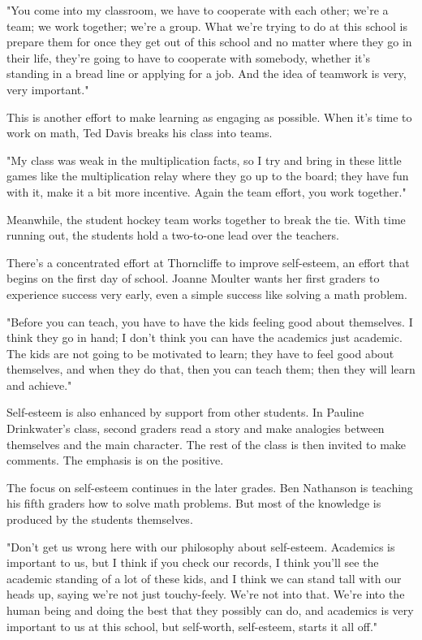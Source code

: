 "You come into my classroom, we have to cooperate with each other; we're a team; we work together; we're a group. What we're trying to do at this school is prepare them for once they get out of this school and no matter where they go in their life, they're going to have to cooperate with somebody, whether it's standing in a bread line or applying for a job. And the idea of teamwork is very, very important."

This is another effort to make learning as engaging as possible. When it's time to work on math, Ted Davis breaks his class into teams.

"My class was weak in the multiplication facts, so I try and bring in these little games like the multiplication relay where they go up to the board; they have fun with it, make it a bit more incentive. Again the team effort, you work together."

Meanwhile, the student hockey team works together to break the tie. With time running out, the students hold a two-to-one lead over the teachers.

There's a concentrated effort at Thorncliffe to improve self-esteem, an effort that begins on the first day of school. Joanne Moulter wants her first graders to experience success very early, even a simple success like solving a math problem.

"Before you can teach, you have to have the kids feeling good about themselves. I think they go in hand; I don't think you can have the academics just academic. The kids are not going to be motivated to learn; they have to feel good about themselves, and when they do that, then you can teach them; then they will learn and achieve."

Self-esteem is also enhanced by support from other students. In Pauline Drinkwater's class, second graders read a story and make analogies between themselves and the main character. The rest of the class is then invited to make comments. The emphasis is on the positive.

The focus on self-esteem continues in the later grades. Ben Nathanson is teaching his fifth graders how to solve math problems. But most of the knowledge is produced by the students themselves.

"Don't get us wrong here with our philosophy about self-esteem. Academics is important to us, but I think if you check our records, I think you'll see the academic standing of a lot of these kids, and I think we can stand tall with our heads up, saying we're not just touchy-feely. We're not into that. We're into the human being and doing the best that they possibly can do, and academics is very important to us at this school, but self-worth, self-esteem, starts it all off."

